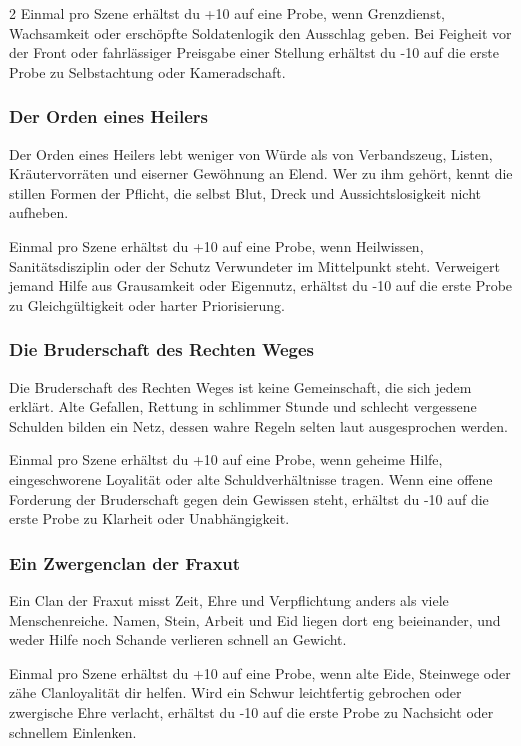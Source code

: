 {\begin{multicols*}{2}
        \bindungspielwertebox
        {Einmal pro Szene erhältst du +10 auf eine Probe, wenn Grenzdienst, Wachsamkeit oder erschöpfte Soldatenlogik den Ausschlag geben.}
        {Bei Feigheit vor der Front oder fahrlässiger Preisgabe einer Stellung erhältst du -10 auf die erste Probe zu Selbstachtung oder Kameradschaft.}

        \subsubsection*{Der Orden eines Heilers}
        Der Orden eines Heilers lebt weniger von Würde als von Verbandszeug, Listen, Kräutervorräten und eiserner Gewöhnung an Elend. Wer zu ihm gehört, kennt die stillen Formen der Pflicht, die selbst Blut, Dreck und Aussichtslosigkeit nicht aufheben.

        \bindungspielwertebox
        {Einmal pro Szene erhältst du +10 auf eine Probe, wenn Heilwissen, Sanitätsdisziplin oder der Schutz Verwundeter im Mittelpunkt steht.}
        {Verweigert jemand Hilfe aus Grausamkeit oder Eigennutz, erhältst du -10 auf die erste Probe zu Gleichgültigkeit oder harter Priorisierung.}

        \subsubsection*{Die Bruderschaft des Rechten Weges}
        Die Bruderschaft des Rechten Weges ist keine Gemeinschaft, die sich jedem erklärt. Alte Gefallen, Rettung in schlimmer Stunde und schlecht vergessene Schulden bilden ein Netz, dessen wahre Regeln selten laut ausgesprochen werden.

        \bindungspielwertebox
        {Einmal pro Szene erhältst du +10 auf eine Probe, wenn geheime Hilfe, eingeschworene Loyalität oder alte Schuldverhältnisse tragen.}
        {Wenn eine offene Forderung der Bruderschaft gegen dein Gewissen steht, erhältst du -10 auf die erste Probe zu Klarheit oder Unabhängigkeit.}

        \subsubsection*{Ein Zwergenclan der Fraxut}
        Ein Clan der Fraxut misst Zeit, Ehre und Verpflichtung anders als viele Menschenreiche. Namen, Stein, Arbeit und Eid liegen dort eng beieinander, und weder Hilfe noch Schande verlieren schnell an Gewicht.

        \bindungspielwertebox
        {Einmal pro Szene erhältst du +10 auf eine Probe, wenn alte Eide, Steinwege oder zähe Clanloyalität dir helfen.}
        {Wird ein Schwur leichtfertig gebrochen oder zwergische Ehre verlacht, erhältst du -10 auf die erste Probe zu Nachsicht oder schnellem Einlenken.}


\end{multicols*}}
